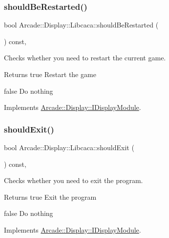 \subsubsection{\texorpdfstring{shouldBeRestarted()}{shouldBeRestarted()}}
{\footnotesize\ttfamily bool Arcade\+::\+Display\+::\+Libcaca\+::should\+Be\+Restarted (\begin{DoxyParamCaption}{ }\end{DoxyParamCaption}) const\hspace{0.3cm}{\ttfamily [final]}, {\ttfamily [virtual]}}



Checks whether you need to restart the current game. 

\begin{DoxyReturn}{Returns}
true Restart the game 

false Do nothing 
\end{DoxyReturn}


Implements \mbox{\hyperlink{classArcade_1_1Display_1_1IDisplayModule_adc5d499229aa5899bbd4bae14f00cb27}{Arcade\+::\+Display\+::\+I\+Display\+Module}}.

\mbox{\label{classArcade_1_1Display_1_1Libcaca_a5920c296d51d72df55b5079c0749031e}} 
\subsubsection{\texorpdfstring{shouldExit()}{shouldExit()}}
{\footnotesize\ttfamily bool Arcade\+::\+Display\+::\+Libcaca\+::should\+Exit (\begin{DoxyParamCaption}{ }\end{DoxyParamCaption}) const\hspace{0.3cm}{\ttfamily [final]}, {\ttfamily [virtual]}}



Checks whether you need to exit the program. 

\begin{DoxyReturn}{Returns}
true Exit the program 

false Do nothing 
\end{DoxyReturn}


Implements \mbox{\hyperlink{classArcade_1_1Display_1_1IDisplayModule_a550877fb92d58325404b9ebe9e71f6ff}{Arcade\+::\+Display\+::\+I\+Display\+Module}}.

